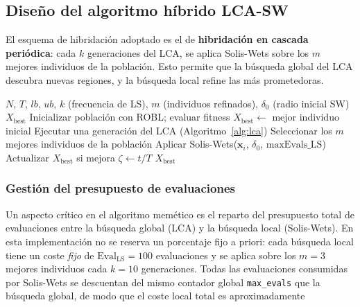 \subsection{Diseño del algoritmo híbrido LCA-SW}

El esquema de hibridación adoptado es el de \textbf{hibridación en cascada periódica}:
cada $k$ generaciones del LCA, se aplica Solis-Wets sobre los $m$ mejores individuos
de la población. Esto permite que la búsqueda global del LCA descubra nuevas regiones,
y la búsqueda local refine las más prometedoras.

\begin{algorithm}[H]
\caption{LCA Memético (LCA-SW)}
\label{alg:lcasw}
\begin{algorithmic}[1]
\Require $N$, $T$, $lb$, $ub$, $k$ (frecuencia de LS), $m$ (individuos refinados), $\delta_0$ (radio inicial SW)
\Ensure $X_{\text{best}}$
\State Inicializar población con ROBL; evaluar fitness 
\State $X_{\text{best}} \leftarrow$ mejor individuo inicial
  \State Ejecutar una generación del LCA (Algoritmo~\ref{alg:lca}) 
   
    \State Seleccionar los $m$ mejores individuos de la población
      \State Aplicar Solis-Wets($\mathbf{x}_i$, $\delta_0$, $\text{maxEvals\_LS}$) 
      \State Actualizar $X_{\text{best}}$ si mejora
    \EndFor
  \EndIf
  \State $\zeta \leftarrow t/T$ 
\EndFor
\State \Return $X_{\text{best}}$
\end{algorithmic}
\end{algorithm}

\subsubsection{Gestión del presupuesto de evaluaciones}

Un aspecto crítico en el algoritmo memético es el reparto del presupuesto total de
evaluaciones entre la búsqueda global (LCA) y la búsqueda local (Solis-Wets). En esta
implementación no se reserva un porcentaje fijo a priori: cada búsqueda local tiene un
coste \emph{fijo} de $\text{Eval}_{\text{LS}} = 100$ evaluaciones y se aplica sobre los
$m=3$ mejores individuos cada $k=10$ generaciones. Todas las evaluaciones consumidas por
Solis-Wets se descuentan del mismo contador global \texttt{max\_evals} que la búsqueda
global, de modo que el coste local total es aproximadamente

